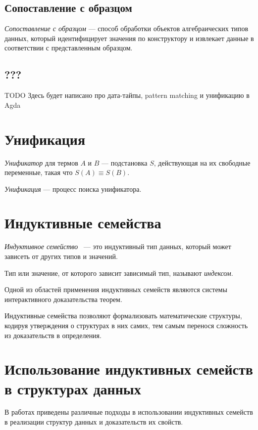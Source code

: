 \subsection{Сопоставление с образцом}

\emph{Сопоставление с образцом} — способ обработки
объектов %
алгебраических типов данных, который идентифицирует значения по конструктору
и извлекает данные в соответствии с представленным образцом.

\subsection{???}
TODO Здесь будет написано про дата-тайпы, pattern matching и
унификацию в Agda



\section{Унификация}

\emph{Унификатор} для термов $A$ и $B$ — подстановка $S$, действующая на их
свободные переменные, такая что $S(A) \equiv S(B)$.

\emph{Унификация} — процесс поиска унификатора.

\section{Индуктивные семейства}

\begin{definition}
\emph{Индуктивное семейство} \cite{DybjerIndFam, RefiningIT}~— это индуктивный тип данных,
который может зависеть от других типов и значений.

Тип или значение, от которого зависит зависимый тип, называют \emph{индексом}.
\end{definition}

Одной из областей применения индуктивных семейств являются системы интерактивного
доказательства теорем.

Индуктивные семейства позволяют формализовать математические структуры, кодируя утверждения о структурах в них самих, тем самым перенося сложность из доказательств в определения.

\section{Использование индуктивных семейств в структурах данных}
В работах \cite{HongweiXi, McBridePivotal} приведены различные подходы
в использовании индуктивных семейств в реализации структур данных
и доказательств их свойств.

